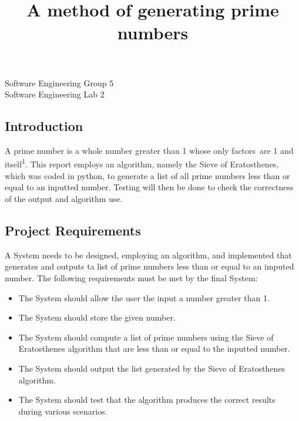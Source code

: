 \documentclass[12pt]{article}
\title{A method of generating prime numbers}
\date{}
\begin{document}
\maketitle
\par

{\fontsize{14pt}{16.8pt}\selectfont Software Engineering Group 5\\
Software Engineering Lab 2 \par}\par


\vspace{\baselineskip}
\subsection*{Introduction}
\setlength{\parskip}{15.0pt}
\begin{justify}
\textcolor[HTML]{222222}{A prime number is a whole number greater than 1 whose only factors are 1 and itself\textsuperscript{1}. This report employs an algorithm, namely the Sieve of Eratosthenes, which was coded in p}ython, to generate a list of all prime numbers less than or equal to an inputted number. Testing will then be done to check the correctness of the output and algorithm use.
\end{justify}\par

\subsection*{Project Requirements}
\begin{justify}
A System needs to be designed, employing an algorithm, and implemented that generates and outputs ta list of prime numbers less than or equal to an imputed number. The following requirements must be met by the final System:
\end{justify}\par

\begin{itemize}
	\item The System should allow the user the input a number greater than 1.\par

	\item The System should store the given number.\par

	\item The System should compute a list of prime numbers using the Sieve of Eratosthenes algorithm that are less than or equal to the inputted number.\par

	\item The System should output the list generated by the Sieve of Eratosthenes algorithm.\par

	\item The System should test that the algorithm produces the correct results during various scenarios.
\end{itemize}\par
\end{document}
